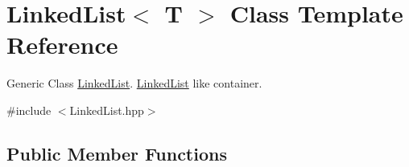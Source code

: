 \hypertarget{class_linked_list}{}\section{Linked\+List$<$ T $>$ Class Template Reference}
\label{class_linked_list}


Generic Class \mbox{\hyperlink{class_linked_list}{Linked\+List}}. \mbox{\hyperlink{class_linked_list}{Linked\+List}} like container.  




{\ttfamily \#include $<$Linked\+List.\+hpp$>$}

\subsection*{Public Member Functions}
